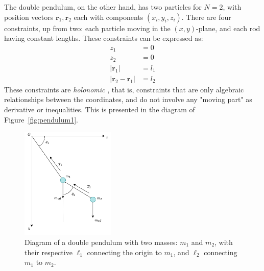 The double pendulum, on the other hand, has two particles for $N=2$, with position vectors $\mathbf{r}_{1},\mathbf{r}_{2}$ each with components $(x_i,y_i,z_i)$. There are four constraints, up from two: each particle moving in the $(x,y)$-plane, and each rod having constant lengths. These constraints can be expressed as: 
\begin{align}
  z_{1} & = 0 \\
  z_{2} & = 0\\
  \lvert \mathbf{r}_{1}\rvert &= l_{1}\\
  \lvert \mathbf{r}_{2} - \mathbf{r}_{1} \rvert &= l_{2}
\end{align}
These constraints are \textit{holonomic} , that is, constraints that are only algebraic relationships between the coordinates, and do not involve any "moving part" as derivative or inequalities. This is presented in the diagram of Figure~\ref{fig:pendulum1}.
\begin{figure}[h!]
  \centering
  \includegraphics[width=0.4\textwidth]{img/doublependulum.png}
  \caption{Diagram of a double pendulum with two masses: $m_{1}$ and $m_2$, with their respective $\ell_{1}$ connecting the origin to $m_1$, and $\ell_{2}$ connecting $m_1$ to $m_2$.}
  \label{fig:pendulum2}
\end{figure}

